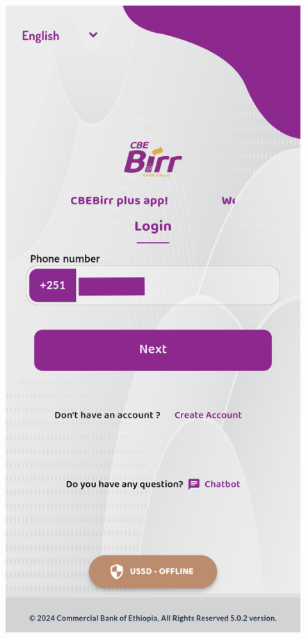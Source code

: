 \documentclass[a4paper,12pt]{report}
\begin{document}
\begin{figure}[h]
  \centering
  \begin{minipage}[b]{0.3\textwidth}
    \includegraphics[width=\linewidth]{../images/screenshots/cbebirr/cbebirr_login.png}

\end{minipage}
\end{figure}
\end{document}
